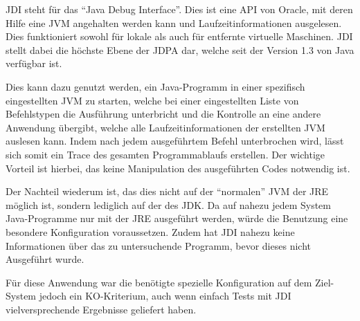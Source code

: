 \ac{JDI} steht für das "`Java Debug Interface"'. Dies ist eine \ac{API} von Oracle, mit deren Hilfe eine \ac{JVM} angehalten werden kann und Laufzeitinformationen ausgelesen. Dies funktioniert sowohl für lokale als auch für entfernte virtuelle Maschinen. \ac{JDI} stellt dabei die höchste Ebene der \ac{JDPA} dar, welche seit der Version 1.3 von Java verfügbar ist.

Dies kann dazu genutzt werden, ein Java-Programm in einer spezifisch eingestellten \ac{JVM} zu starten, welche bei einer eingestellten Liste von Befehlstypen die Ausführung unterbricht und die Kontrolle an eine andere Anwendung übergibt, welche alle Laufzeitinformationen der erstellten \ac{JVM} auslesen kann. Indem nach jedem ausgeführtem Befehl unterbrochen wird, lässt sich somit ein Trace des gesamten Programmablaufs erstellen. Der wichtige Vorteil ist hierbei, das keine Manipulation des ausgeführten Codes notwendig ist.

Der Nachteil wiederum ist, das dies nicht auf der "`normalen"' \ac{JVM} der \ac{JRE} möglich ist, sondern lediglich auf der des \ac{JDK}. Da auf nahezu jedem System Java-Programme nur mit der \ac{JRE} ausgeführt werden, würde die Benutzung eine besondere Konfiguration voraussetzen. Zudem hat \ac{JDI} nahezu keine Informationen über das zu untersuchende Programm, bevor dieses nicht Ausgeführt wurde.

Für diese Anwendung war die benötigte spezielle Konfiguration auf dem Ziel-System jedoch ein KO-Kriterium, auch wenn einfach Tests mit \ac{JDI} vielversprechende Ergebnisse geliefert haben.